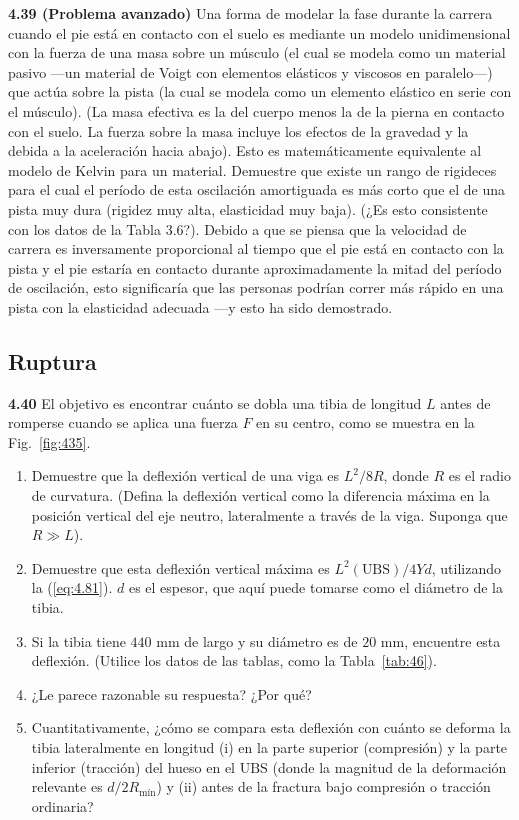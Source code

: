 \documentclass[12pt]{book}
\begin{document}
\textbf{4.39 (Problema avanzado)} Una forma de modelar la fase durante la carrera cuando el pie está en contacto con el suelo es mediante un modelo unidimensional con la fuerza de una masa sobre un músculo (el cual se modela como un material pasivo ---un material de Voigt con elementos elásticos y viscosos en paralelo---) que actúa sobre la pista (la cual se modela como un elemento elástico en serie con el músculo). (La masa efectiva es la del cuerpo menos la de la pierna en contacto con el suelo. La fuerza sobre la masa incluye los efectos de la gravedad y la debida a la aceleración hacia abajo). Esto es matemáticamente equivalente al modelo de Kelvin para un material. Demuestre que existe un rango de rigideces para el cual el período de esta oscilación amortiguada es más corto que el de una pista muy dura (rigidez muy alta, elasticidad muy baja). (¿Es esto consistente con los datos de la Tabla 3.6?). Debido a que se piensa que la velocidad de carrera es inversamente proporcional al tiempo que el pie está en contacto con la pista y el pie estaría en contacto durante aproximadamente la mitad del período de oscilación, esto significaría que las personas podrían correr más rápido en una pista con la elasticidad adecuada ---y esto ha sido demostrado.

\subsection*{Ruptura}

\textbf{4.40} El objetivo es encontrar cuánto se dobla una tibia de longitud $L$ antes de romperse cuando se aplica una fuerza $F$ en su centro, como se muestra en la Fig.~\ref{fig:435}.
\begin{enumerate}
  \item[(a)] Demuestre que la deflexión vertical de una viga es $L^2/8R$, donde $R$ es el radio de curvatura. (Defina la deflexión vertical como la diferencia máxima en la posición vertical del eje neutro, lateralmente a través de la viga. Suponga que $R \gg L$).
  \item[(b)] Demuestre que esta deflexión vertical máxima es $L^2(\text{UBS})/4Yd$, utilizando la (\ref{eq:4.81}). $d$ es el espesor, que aquí puede tomarse como el diámetro de la tibia.
  \item[(c)] Si la tibia tiene $440\text{ mm}$ de largo y su diámetro es de $20\text{ mm}$, encuentre esta deflexión. (Utilice los datos de las tablas, como la Tabla~\ref{tab:46}).
  \item[(d)] ¿Le parece razonable su respuesta? ¿Por qué?
  \item[(e)] Cuantitativamente, ¿cómo se compara esta deflexión con cuánto se deforma la tibia lateralmente en longitud (i) en la parte superior (compresión) y la parte inferior (tracción) del hueso en el $\text{UBS}$ (donde la magnitud de la deformación relevante es $d/2R_{\text{mín}}$) y (ii) antes de la fractura bajo compresión o tracción ordinaria?
\end{enumerate}
\end{document}

